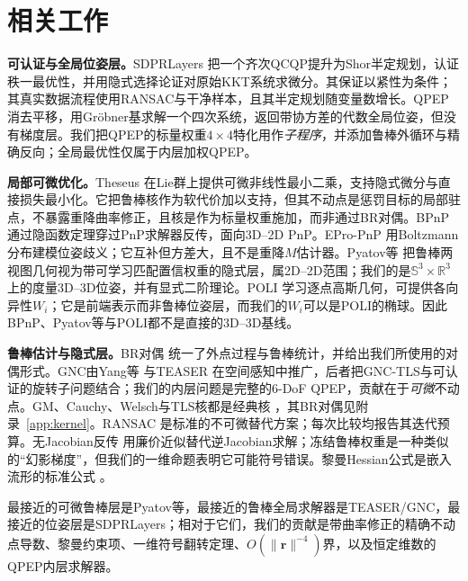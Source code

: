 \section{相关工作}
\label{sec:related}

\noindent\textbf{可认证与全局位姿层。}SDPRLayers \cite{holmes2025sdpr}把一个齐次QCQP提升为Shor半定规划，认证秩一最优性，并用隐式选择论证对原始KKT系统求微分。其保证以紧性为条件；其真实数据流程使用RANSAC与干净样本，且其半定规划随变量数增长。QPEP \cite{wu2022qpep}消去平移，用Gr\"obner基求解一个四次系统，返回带协方差的代数全局位姿，但没有梯度层。我们把QPEP的标量权重$4\times4$特化用作\emph{子程序}，并添加鲁棒外循环与精确反向；全局最优性仅属于内层加权QPEP。

\noindent\textbf{局部可微优化。}Theseus \cite{pineda2022theseus}在Lie群上提供可微非线性最小二乘，支持隐式微分与直接损失最小化。它把鲁棒核作为软代价加以支持，但其不动点是惩罚目标的局部驻点，不暴露重降曲率修正，且核是作为标量权重施加，而非通过BR对偶。BPnP \cite{chen2020bpn}通过隐函数定理穿过PnP求解器反传，面向3D--2D PnP。EPro-PnP \cite{chen2022epropnp}用Boltzmann分布建模位姿歧义；它互补但方差大，且不是重降$M$估计器。Pyatov等 \cite{pyatov2024robust}把鲁棒两视图几何视为带可学习匹配置信权重的隐式层，属2D--2D范围；我们的是$\mathbb{S}^3\times\mathbb{R}^3$上的度量3D--3D位姿，并有显式二阶理论。POLI \cite{poli2026}学习逐点高斯几何，可提供各向异性$W_i$；它是前端表示而非鲁棒位姿层，而我们的$W_i$可以是POLI的椭球。因此BPnP、Pyatov等与POLI都不是直接的3D--3D基线。

\noindent\textbf{鲁棒估计与隐式层。}BR对偶 \cite{black1996br}统一了外点过程与鲁棒统计，并给出我们所使用的对偶形式。GNC由Yang等 \cite{yang2020gnc}与TEASER \cite{yang2020teaser}在空间感知中推广，后者把GNC-TLS与可认证的旋转子问题结合；我们的内层问题是完整的6-DoF QPEP，贡献在于\emph{可微}不动点。GM、Cauchy、Welsch与TLS核都是经典核 \cite{geman1985}，其BR对偶见附录~\ref{app:kernel}。RANSAC \cite{fischler1981ransac}是标准的不可微替代方案；每次比较均报告其迭代预算。无Jacobian反传 \cite{fung2022jfb}用廉价近似替代逆Jacobian求解；冻结鲁棒权重是一种类似的“幻影梯度”，但我们的一维命题表明它可能符号错误。黎曼Hessian公式是嵌入流形的标准公式 \cite{absil2008}。

最接近的可微鲁棒层是Pyatov等，最接近的鲁棒全局求解器是TEASER/GNC，最接近的位姿层是SDPRLayers；相对于它们，我们的贡献是带曲率修正的精确不动点导数、黎曼约束项、一维符号翻转定理、$O(\|\mathbf{r}\|^{-4})$界，以及恒定维数的QPEP内层求解器。
